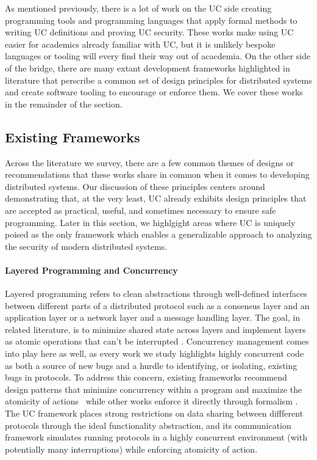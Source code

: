 As mentioned previously, there is a lot of work on the UC side creating
programming tools and programming languages that apply formal methods to
writing UC definitions and proving UC security.  These works make using UC
easier for academics already familiar with UC, but it is unlikely bespoke
languages or tooling will every find their way out of acacdemia.  On the other
side of the bridge, there are many extant development frameworks highlighted in
literature that perscribe a common set of design principles for distributed
systems and create software tooling to encourage or enforce them.  We cover
these works in the remainder of the section.

\subsection{Existing Frameworks}
Across the literature we survey, there are a few common themes of designs or
recommendations that these works share in common when it comes to developing
distributed systems.  Our discussion of these principles centers around
demonstrating that, at the very least, UC already exhibits design principles
that are accepted as practical, useful, and sometimes necessary to ensure safe
programming.  Later in this section, we highlgight areas where UC is uniquely
poised as the only framework which enables a generalizable approach to
analyzing the security of modern distributed systems. 

\paragraph{Layered Programming and Concurrency}
Layered programming refers to clean abstractions through well-defined
interfaces between different parts of a distributed protocol such as a
consensus layer and an application layer or a network layer and a message
handling layer.  The goal, in related literature, is to minimize shared state
across layers and implement layers as atomic operations that can't be
interrupted \cite{killian2007mace, bolosky2007farsite}.  Concurrency management
comes into play here as well, as every work we study highlights highly
concurrent code as both a source of new bugs and a hurdle to identifying, or
isolating, existing bugs in protocols.  To address this concern, existing
frameworks recommend design patterns that minimize concurrency within a program
and maximize the atomicity of actions~\cite{bolosky2007farsite} while other
works enforce it directly through formalism \cite{killian2007mace,
wilcox2015verdi}.  The UC framework places strong restrictions on data sharing
between diffferent protocols through the ideal functionality abstraction, and
its communication framework simulates running protocols in a highly concurrent
environment (with potentially many interruptions) while enforcing atomicity of
action.

